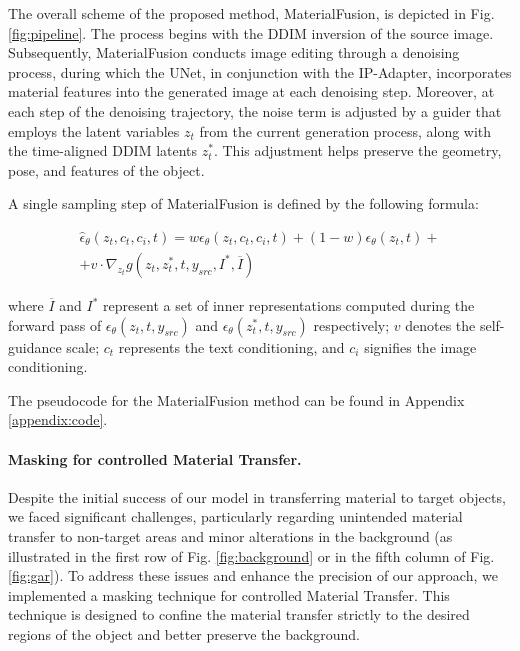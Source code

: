 The overall scheme of the proposed method, MaterialFusion, is depicted in Fig.\ref{fig:pipeline}. The process begins with the DDIM inversion of the source image. Subsequently, MaterialFusion conducts image editing through a denoising process, during which the UNet, in conjunction with the IP-Adapter, incorporates material features into the generated image at each denoising step. Moreover, at each step of the denoising trajectory, the noise term is adjusted by a guider that employs the latent variables $z_t$ from the current generation process, along with the time-aligned DDIM latents $z^*_t$. This adjustment helps preserve the geometry, pose, and features of the object.

A single sampling step of MaterialFusion is defined by the following formula:

\begin{equation}
\begin{split}
  \hat{\epsilon}_{\theta}(z_{t}, c_t, c_i, t) = w\epsilon_{\theta}(z_{t}, c_t, c_i, t) + (1-w)\epsilon_{\theta}(z_{t}, t) + \\  + v \cdot \nabla_{z_t}g(z_t, z_t^*, t, y_{src}, I^{*}, \overline{I})
  \label{eq:cfg}
\end{split}
\end{equation}

where $\overline{I}$ and $I^*$ represent a set of inner representations computed during the forward pass of $\epsilon_\theta(z_t, t, y_{src})$ and $\epsilon_\theta(z^*_t, t, y_{src})$ respectively; $v$ denotes the self-guidance scale; $c_{t}$ represents the text conditioning, and $c_{i}$ signifies the image conditioning.

The pseudocode for the MaterialFusion method can be found in Appendix \ref{appendix:code}.


\paragraph{Masking for controlled Material Transfer.} Despite the initial success of our model in transferring material to target objects, we faced significant challenges, particularly regarding unintended material transfer to non-target areas and minor alterations in the background (as illustrated in the first row of Fig. \ref{fig:background} or in the fifth column of Fig. \ref{fig:gar}). To address these issues and enhance the precision of our approach, we implemented a masking technique for controlled Material Transfer. This technique is designed to confine the material transfer strictly to the desired regions of the object and better preserve the background.

